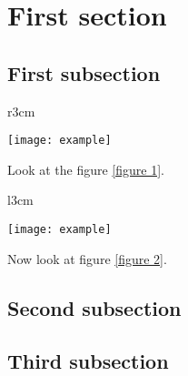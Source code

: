 \section{First section}

\subsection{First subsection}
\begin{wrapfigure}{r}{3cm} %
	\begin{center}
		\texttt{[image: example]}
	\end{center}
	\caption{Photo example}
	\label{figure 1}
\end{wrapfigure}

\lipsum[1-2]

Look at the figure \ref{figure 1}. %
\lipsum[3]

\begin{wrapfigure}{l}{3cm}
	\begin{center}
		\texttt{[image: example]}
	\end{center}
	\caption{Photo example}
	\label{figure 2}
\end{wrapfigure}

Now look at figure \ref{figure 2}.
\lipsum[4-10]

\subsection{Second subsection}
\lipsum[2-3]
\lipsum[4]

\subsection{Third subsection}
\lipsum[5-7]
